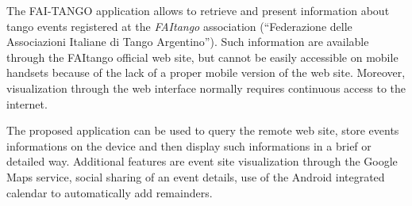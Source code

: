 \documentclass[10pt, twoside]{article}
\newcommand{\app}{FAI-TANGO }
\begin{document}
The \app application allows to retrieve and present information about
tango events registered at the \emph{FAItango} association 
(``Federazione delle Associazioni Italiane di Tango Argentino'').
Such information are available through the FAItango official web site,
but cannot be easily accessible on mobile handsets because of the lack of
a proper mobile version of the web site. 
Moreover, visualization through the web interface normally requires continuous
access to the internet.

The proposed application can be used to query the remote web site, store
events informations on the device and then display such informations in
a brief or detailed way. Additional features are event site visualization
through the Google Maps service, social sharing of an event details,
use of the Android integrated calendar to automatically add remainders.
\end{document}
